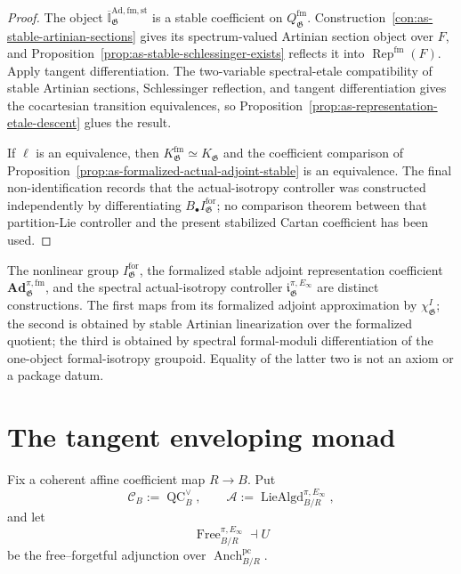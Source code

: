 \begin{proof}
The object
$\overline{\mathbb I}_{\mathfrak G}^{\mathrm{Ad,fm,st}}$ is a stable
coefficient on $Q_{\mathfrak G}^{\mathrm{fm}}$.  Construction~\ref{con:as-stable-artinian-sections} gives its spectrum-valued Artinian
section object over $F$, and
Proposition~\ref{prop:as-stable-schlessinger-exists} reflects it into
$\operatorname{Rep}^{\mathrm{fm}}(F)$.  Apply tangent differentiation.
The two-variable spectral-etale compatibility of stable Artinian sections,
Schlessinger reflection, and tangent differentiation gives the cocartesian
transition equivalences, so
Proposition~\ref{prop:as-representation-etale-descent} glues the result.

If $\ell$ is an equivalence, then
$K_{\mathfrak G}^{\mathrm{fm}}\simeq K_{\mathfrak G}$ and the coefficient
comparison of
Proposition~\ref{prop:as-formalized-actual-adjoint-stable} is an equivalence.
The final non-identification records that the actual-isotropy controller was
constructed independently by differentiating
$B_\bullet I_{\mathfrak G}^{\mathrm{for}}$; no comparison theorem between
that partition-Lie controller and the present stabilized Cartan coefficient
has been used.
\end{proof}

\begin{remark}
The nonlinear group
$I_{\mathfrak G}^{\mathrm{for}}$, the formalized stable adjoint
representation coefficient
$\mathbf{Ad}_{\mathfrak G}^{\pi,\mathrm{fm}}$, and the spectral
actual-isotropy controller
$\mathfrak i_{\mathfrak G}^{\pi,E_\infty}$ are distinct constructions.
The first maps from its formalized adjoint approximation by
$\chi_{\mathfrak G}^{I}$; the second is obtained by stable Artinian
linearization over the formalized quotient; the third is obtained by
spectral formal-moduli differentiation of the one-object formal-isotropy
groupoid.  Equality of the latter two is not an axiom or a package datum.
\end{remark}

\section{The tangent enveloping monad}
\label{sec:as-enveloping-monad}

Fix a coherent affine coefficient map $R\to B$.  Put
\[
    \mathcal C_B:=\operatorname{QC}^{\vee}_B,
    \qquad
    \mathcal A:=\operatorname{LieAlgd}^{\pi,E_\infty}_{B/R},
\]
and let
\[
    \operatorname{Free}^{\pi,E_\infty}_{B/R}
    \dashv U
\]
be the free--forgetful adjunction over
$\operatorname{Anch}^{\mathrm{pc}}_{B/R}$.


